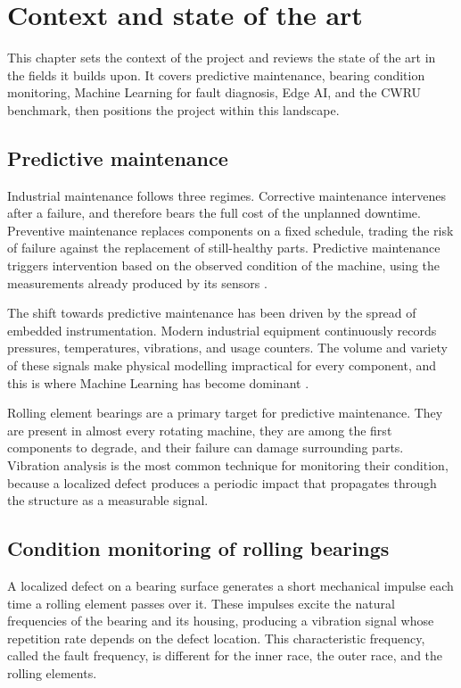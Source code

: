 \chapter{Context and state of the art}
\label{ch:context}

This chapter sets the context of the project and reviews the state of the art in the fields it builds upon. It covers predictive maintenance, bearing condition monitoring, Machine Learning for fault diagnosis, Edge AI, and the CWRU benchmark, then positions the project within this landscape.

\section{Predictive maintenance}

Industrial maintenance follows three regimes. Corrective maintenance intervenes after a failure, and therefore bears the full cost of the unplanned downtime. Preventive maintenance replaces components on a fixed schedule, trading the risk of failure against the replacement of still-healthy parts. Predictive maintenance triggers intervention based on the observed condition of the machine, using the measurements already produced by its sensors \cite{carvalho2019predictive}.

The shift towards predictive maintenance has been driven by the spread of embedded instrumentation. Modern industrial equipment continuously records pressures, temperatures, vibrations, and usage counters. The volume and variety of these signals make physical modelling impractical for every component, and this is where Machine Learning has become dominant \cite{theissler2021predictive}.

Rolling element bearings are a primary target for predictive maintenance. They are present in almost every rotating machine, they are among the first components to degrade, and their failure can damage surrounding parts. Vibration analysis is the most common technique for monitoring their condition, because a localized defect produces a periodic impact that propagates through the structure as a measurable signal.

\section{Condition monitoring of rolling bearings}

A localized defect on a bearing surface generates a short mechanical impulse each time a rolling element passes over it. These impulses excite the natural frequencies of the bearing and its housing, producing a vibration signal whose repetition rate depends on the defect location. This characteristic frequency, called the fault frequency, is different for the inner race, the outer race, and the rolling elements.

